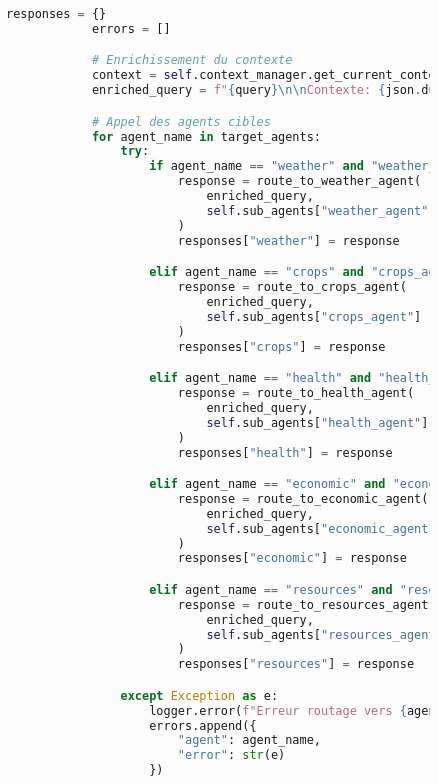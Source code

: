 \begin{figure}[H]
\begin{lstlisting}[language=Python, caption=Structure complète de l'agent principal]
            responses = {}
            errors = []

            # Enrichissement du contexte
            context = self.context_manager.get_current_context()
            enriched_query = f"{query}\n\nContexte: {json.dumps(context)}"

            # Appel des agents cibles
            for agent_name in target_agents:
                try:
                    if agent_name == "weather" and "weather_agent" in self.sub_agents:
                        response = route_to_weather_agent(
                            enriched_query,
                            self.sub_agents["weather_agent"]
                        )
                        responses["weather"] = response

                    elif agent_name == "crops" and "crops_agent" in self.sub_agents:
                        response = route_to_crops_agent(
                            enriched_query,
                            self.sub_agents["crops_agent"]
                        )
                        responses["crops"] = response

                    elif agent_name == "health" and "health_agent" in self.sub_agents:
                        response = route_to_health_agent(
                            enriched_query,
                            self.sub_agents["health_agent"]
                        )
                        responses["health"] = response

                    elif agent_name == "economic" and "economic_agent" in self.sub_agents:
                        response = route_to_economic_agent(
                            enriched_query,
                            self.sub_agents["economic_agent"]
                        )
                        responses["economic"] = response

                    elif agent_name == "resources" and "resources_agent" in self.sub_agents:
                        response = route_to_resources_agent(
                            enriched_query,
                            self.sub_agents["resources_agent"]
                        )
                        responses["resources"] = response

                except Exception as e:
                    logger.error(f"Erreur routage vers {agent_name}: {str(e)}")
                    errors.append({
                        "agent": agent_name,
                        "error": str(e)
                    })


\end{lstlisting}
\end{figure}
